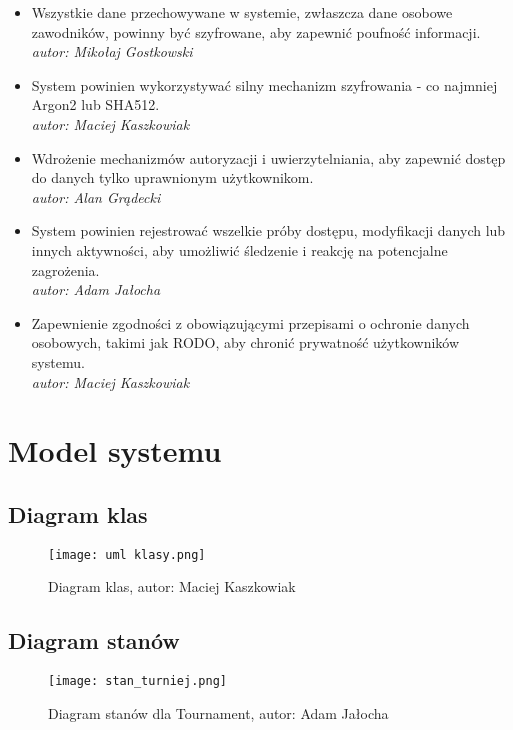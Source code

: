 \documentclass[polish, a4paper]{article}
\begin{document}
\begin{itemize}

\item Wszystkie dane przechowywane w systemie, zwłaszcza dane osobowe zawodników, powinny być szyfrowane, aby zapewnić poufność informacji.\\ \emph{autor: Mikołaj Gostkowski}

\item System powinien wykorzystywać silny mechanizm szyfrowania - co najmniej Argon2 lub SHA512.\\ \emph{autor: Maciej Kaszkowiak}

\item Wdrożenie mechanizmów autoryzacji i uwierzytelniania, aby zapewnić dostęp do danych tylko uprawnionym użytkownikom.\\ \emph{autor: Alan Grądecki}

\item System powinien rejestrować wszelkie próby dostępu, modyfikacji danych lub innych aktywności, aby umożliwić śledzenie i reakcję na potencjalne zagrożenia.\\ \emph{autor: Adam Jałocha}

\item Zapewnienie zgodności z obowiązującymi przepisami o ochronie danych osobowych, takimi jak RODO, aby chronić prywatność użytkowników systemu.\\ \emph{autor: Maciej Kaszkowiak}

\end{itemize}


\section{Model systemu}
\subsection{Diagram klas}

\begin{figure}[H]
  \centering
  \texttt{[image: uml klasy.png]}
  \caption{Diagram klas, autor: Maciej Kaszkowiak}
\end{figure}

\subsection{Diagram stanów}
\begin{figure}[H]
  \centering
  \texttt{[image: stan\_turniej.png]}
  \caption{Diagram stanów dla Tournament, autor: Adam Jałocha}
\end{figure}
\end{document}
